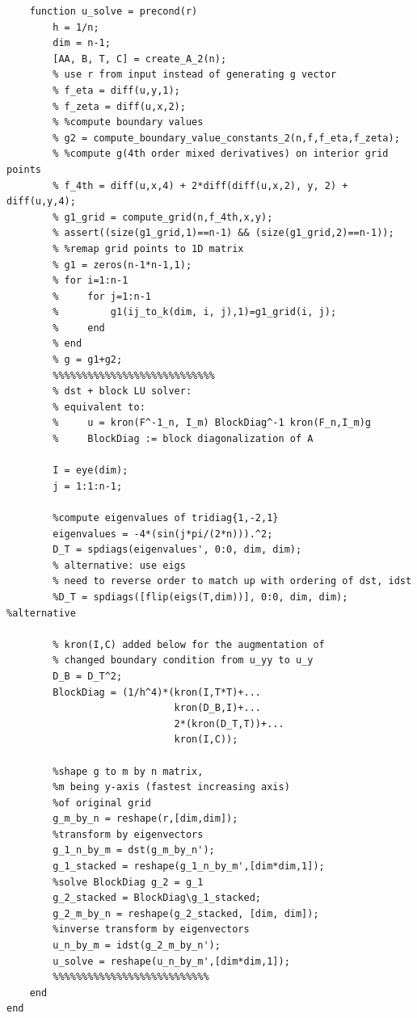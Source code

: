 \documentclass[12pt,letter]{article}
\begin{document}
\begin{enumerate}
\begin{enumerate}
\begin{verbatim}
    function u_solve = precond(r)
        h = 1/n;
        dim = n-1;
        [AA, B, T, C] = create_A_2(n);
        % use r from input instead of generating g vector
        % f_eta = diff(u,y,1);
        % f_zeta = diff(u,x,2);
        % %compute boundary values
        % g2 = compute_boundary_value_constants_2(n,f,f_eta,f_zeta);
        % %compute g(4th order mixed derivatives) on interior grid points
        % f_4th = diff(u,x,4) + 2*diff(diff(u,x,2), y, 2) + diff(u,y,4);
        % g1_grid = compute_grid(n,f_4th,x,y);
        % assert((size(g1_grid,1)==n-1) && (size(g1_grid,2)==n-1));
        % %remap grid points to 1D matrix
        % g1 = zeros(n-1*n-1,1);
        % for i=1:n-1
        %     for j=1:n-1
        %         g1(ij_to_k(dim, i, j),1)=g1_grid(i, j);
        %     end
        % end
        % g = g1+g2;
        %%%%%%%%%%%%%%%%%%%%%%%%%%%%
        % dst + block LU solver:
        % equivalent to:
        %     u = kron(F^-1_n, I_m) BlockDiag^-1 kron(F_n,I_m)g
        %     BlockDiag := block diagonalization of A

        I = eye(dim);
        j = 1:1:n-1;
    
        %compute eigenvalues of tridiag{1,-2,1}
        eigenvalues = -4*(sin(j*pi/(2*n))).^2;
        D_T = spdiags(eigenvalues', 0:0, dim, dim);
        % alternative: use eigs
        % need to reverse order to match up with ordering of dst, idst
        %D_T = spdiags([flip(eigs(T,dim))], 0:0, dim, dim); %alternative
    
        % kron(I,C) added below for the augmentation of 
        % changed boundary condition from u_yy to u_y
        D_B = D_T^2;
        BlockDiag = (1/h^4)*(kron(I,T*T)+...
                             kron(D_B,I)+...
                             2*(kron(D_T,T))+...
                             kron(I,C));

        %shape g to m by n matrix, 
        %m being y-axis (fastest increasing axis)
        %of original grid
        g_m_by_n = reshape(r,[dim,dim]);
        %transform by eigenvectors
        g_1_n_by_m = dst(g_m_by_n');
        g_1_stacked = reshape(g_1_n_by_m',[dim*dim,1]);
        %solve BlockDiag g_2 = g_1
        g_2_stacked = BlockDiag\g_1_stacked;
        g_2_m_by_n = reshape(g_2_stacked, [dim, dim]);
        %inverse transform by eigenvectors
        u_n_by_m = idst(g_2_m_by_n');
        u_solve = reshape(u_n_by_m',[dim*dim,1]);
        %%%%%%%%%%%%%%%%%%%%%%%%%%%
    end
end
\end{verbatim}

\pagebreak


\end{enumerate}
\end{enumerate}
\end{document}
